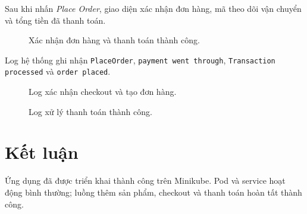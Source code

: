 Sau khi nhấn \textit{Place Order}, giao diện xác nhận đơn hàng, mã theo dõi vận chuyển và tổng tiền đã thanh toán.

\begin{figure}[H]
  \centering
  \caption{Xác nhận đơn hàng và thanh toán thành công.}
\end{figure}

Log hệ thống ghi nhận \texttt{PlaceOrder}, \texttt{payment went through}, \texttt{Transaction processed} và \texttt{order placed}.

\begin{figure}[H]
  \centering
  \caption{Log xác nhận checkout và tạo đơn hàng.}
\end{figure}

\begin{figure}[H]
  \centering
  \caption{Log xử lý thanh toán thành công.}
\end{figure}

\section{Kết luận}

Ứng dụng đã được triển khai thành công trên Minikube. Pod và service hoạt động bình thường; luồng thêm sản phẩm, checkout và thanh toán hoàn tất thành công.
